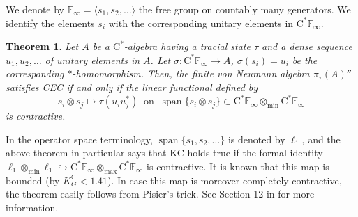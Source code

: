 \documentclass[12pt]{amsart}
\newtheorem{thm}{Theorem}
\theoremstyle{definition}
\begin{document}
We denote by ${{\mathbb F}}_\infty=\langle s_1,s_2,\ldots\rangle$ the free group on countably many generators.
We identify the elements $s_i$ with the corresponding unitary elements in $\mathrm{C^*}{{\mathbb F}}_\infty$.
\begin{thm}\label{thm:cecmin}
Let $A$ be a {$\mathrm{C}^*$-alge\-bra\xspace} having a tracial state $\tau$ and a dense sequence $u_1,u_2,\ldots$ of
unitary elements in $A$.
Let $\sigma\colon \mathrm{C^*}{{\mathbb F}}_\infty\to A$, $\sigma(s_i)=u_i$ be the corresponding {$*$-homo\-mor\-phism\xspace}.
Then, the finite von Neumann algebra $\pi_\tau(A)''$ satisfies CEC if and only if
the linear functional defined by
\[
s_i\otimes s_j\mapsto\tau(u_iu_j^*)
\ \mbox{ on }\
\operatorname*{span}\{ s_i\otimes s_j\}\subset \mathrm{C^*}{{\mathbb F}}_\infty\otimes_{\min}\mathrm{C^*}{{\mathbb F}}_\infty
\]
is contractive.
\end{thm}

In the operator space terminology, $\operatorname*{span}\{s_1,s_2,\ldots\}$ is denoted by $\ell_1$, and
the above theorem in particular says that KC holds true if
the formal identity $\ell_1\otimes_{\min}\ell_1\hookrightarrow
 \mathrm{C^*}{{\mathbb F}}_\infty\otimes_{\max}\mathrm{C^*}{{\mathbb F}}_\infty$
is contractive. It is known that this map is bounded (by $K^{{\mathbb C}}_G<1.41$).
In case this map is moreover completely contractive, the theorem easily
follows from Pisier's trick. See Section 12 in \cite{pisier:g} for more information.
\end{document}
